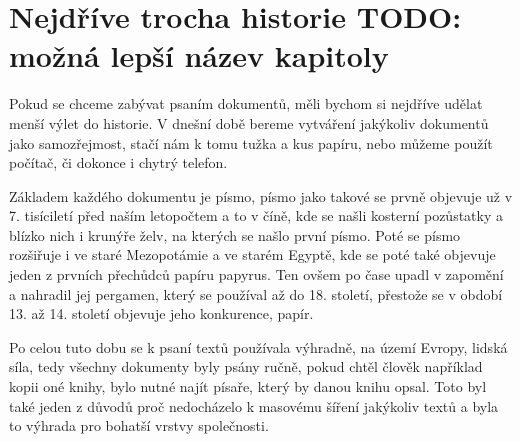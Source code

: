 \chapter{Nejdříve trocha historie TODO: možná lepší název kapitoly}

Pokud se chceme zabývat psaním dokumentů, měli bychom si nejdříve udělat menší výlet do historie. V dnešní době bereme vytváření
jakýkoliv dokumentů jako samozřejmost, stačí nám k tomu tužka a kus papíru, nebo můžeme použít počítač, či dokonce i chytrý telefon.

Základem každého dokumentu je písmo, písmo jako takové se prvně objevuje už v 7. tisíciletí před naším letopočtem a to v číně,
kde se našli kosterní pozůstatky a blízko nich i krunýře želv, na kterých se našlo první písmo. \cite{EarliestWriting} Poté se písmo rozšiřuje
i ve staré Mezopotámie a ve starém Egyptě, kde se poté také objevuje jeden z prvních přechůdců papíru papyrus. Ten ovšem po čase upadl
v zapomění a nahradil jej pergamen, který se používal až do 18. století, přestože se v období 13. až 14. století objevuje jeho konkurence, papír.

Po celou tuto dobu se k psaní textů používala výhradně, na území Evropy, lidská síla, tedy všechny dokumenty byly psány ručně, pokud chtěl člověk například
kopii oné knihy, bylo nutné najít písaře, který by danou knihu opsal. Toto byl také jeden z důvodů proč nedocházelo k masovému šíření jakýkoliv textů a byla
to výhrada pro bohatší vrstvy společnosti.